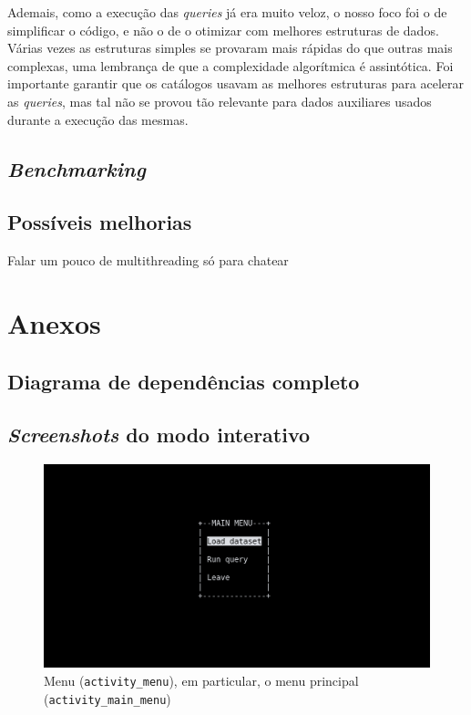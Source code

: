 \documentclass[12pt, a4paper]{article}
\begin{document}
Ademais, como a execução das \emph{queries} já era muito veloz, o nosso foco foi o de simplificar
o código, e não o de o otimizar com melhores estruturas de dados. Várias vezes as estruturas simples
se provaram mais rápidas do que outras mais complexas, uma lembrança de que a complexidade
algorítmica é assintótica. Foi importante garantir que os catálogos usavam as
melhores estruturas para acelerar as \emph{queries}, mas tal não se provou tão relevante para dados
auxiliares usados durante a execução das mesmas.

\subsection{\emph{Benchmarking}}
\label{sec:benchmarking}


\subsection{Possíveis melhorias}
\label{sec:possible-performance-improvements}

{\color{red} Falar um pouco de multithreading só para chatear}

\pagebreak
\section{Anexos}
\label{sec:annexes}

\subsection{Diagrama de dependências completo}
\label{sec:complete-diagram}


\subsection{\emph{Screenshots} do modo interativo}
\label{sec:interactive-screenshots}

\begin{figure}[H]
    \centering
    \includegraphics[scale=0.25]{res-fase2/interactive_screenshots/main_menu.png}
    \caption{Menu (\texttt{activity\_menu}), em particular, o menu principal
             (\texttt{activity\_main\_menu})}
    \label{fig:main_menu}
\end{figure}
\end{document}
